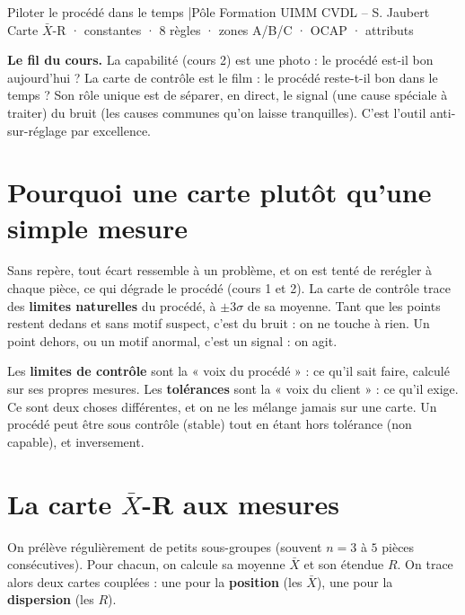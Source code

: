 \documentclass[11pt]{article}
\begin{document}
{Piloter le procédé dans le temps \quad|\quad Pôle Formation UIMM CVDL – S. Jaubert}
{Carte $\bar{X}$-R · constantes · 8 règles · zones A/B/C · OCAP · attributs}

\begin{lead}
\textbf{\color{uimmblue}Le fil du cours.} La capabilité (cours 2) est une photo : le procédé est-il bon aujourd'hui ? La carte de contrôle est le film : le procédé reste-t-il bon dans le temps ? Son rôle unique est de séparer, en direct, le signal (une cause spéciale à traiter) du bruit (les causes communes qu'on laisse tranquilles). C'est l'outil anti-sur-réglage par excellence.
\end{lead}

\section{Pourquoi une carte plutôt qu'une simple mesure}

Sans repère, tout écart ressemble à un problème, et on est tenté de rerégler à chaque pièce, ce qui dégrade le procédé (cours 1 et 2). La carte de contrôle trace des \textbf{limites naturelles} du procédé, à $\pm 3\sigma$ de sa moyenne. Tant que les points restent dedans et sans motif suspect, c'est du bruit : on ne touche à rien. Un point dehors, ou un motif anormal, c'est un signal : on agit.

\begin{cle}
Les \textbf{limites de contrôle} sont la « voix du procédé » : ce qu'il sait faire, calculé sur ses propres mesures. Les \textbf{tolérances} sont la « voix du client » : ce qu'il exige. Ce sont deux choses différentes, et on ne les mélange jamais sur une carte. Un procédé peut être sous contrôle (stable) tout en étant hors tolérance (non capable), et inversement.
\end{cle}

\section{La carte $\bar{X}$-R aux mesures}

On prélève régulièrement de petits sous-groupes (souvent $n = 3$ à $5$ pièces consécutives). Pour chacun, on calcule sa moyenne $\bar{X}$ et son étendue $R$. On trace alors deux cartes couplées : une pour la \textbf{position} (les $\bar{X}$), une pour la \textbf{dispersion} (les $R$).
\end{document}
